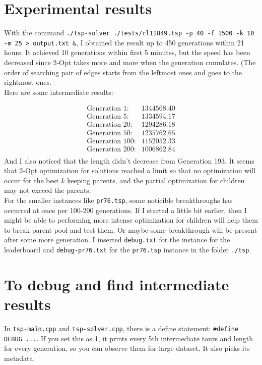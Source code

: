 \documentclass[11pt]{article}
\begin{document}
\section{Experimental results} \label{sec:3}

With the command \texttt{./tsp-solver ./tests/rl11849.tsp -p 40 -f 1500 -k 10 -m 25 > output.txt \&}, I obtained the result up to 450 generations within 21 hours. It achieved 10 generations within first 5 minutes, but the speed has been decreased since 2-Opt takes more and more when the generation cumulates. (The order of searching pair of edges starts from the leftmost ones and goes to the rightmost ones. \\
Here are some intermediate results:

\begin{align*}
	\text{Generation 1}:& 1344568.40 \\
	\text{Generation 5}:& 1334594.17 \\
	\text{Generation 20}:& 1294286.18 \\
	\text{Generation 50}:& 1235762.65 \\
	\text{Generation 100}:& 1152052.33 \\
	\text{Generation 200}:& 1006862.84 \\
\end{align*}
And I also noticed that the length didn't decrease from Generation 193. It seems that 2-Opt optimization for solutions reached a limit so that no optimization will occur for the best $k$ keeping parents, and the partial optimization for children may not exceed the parents. \\
For the smaller instances like \texttt{pr76.tsp}, some noticible breakthroughs has occurred at once per 100-200 generations. If I started a little bit earlier, then I might be able to performing more intense optimization for children will help them to break parent pool and test them. Or maybe some breakthrough will be present after some more generation.
I inserted \texttt{debug.txt} for the instance for the leaderboard and \texttt{debug-pr76.txt} for the \texttt{pr76.tsp} instance in the folder \texttt{./tsp}.

\section{To debug and find intermediate results}
In \texttt{tsp-main.cpp} and \texttt{tsp-solver.cpp}, there is a define statement: \texttt{\#define DEBUG ...}. If you set this as 1, it prints every 5th intermediate tours and length for every generation, so you can observe them for large dataset. It also picks its metadata.
\end{document}
